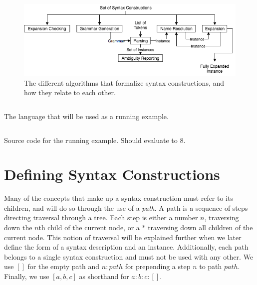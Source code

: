 \documentclass{kththesis}
\begin{document}
\begin{figure}[b]
\includegraphics[width=\textwidth]{resources/formalization-flowchart}
\caption{The different algorithms that formalize syntax constructions, and how they relate to each other.}
\label{fig:formalization-flowchart}
\end{figure}

\clearpage
{}
\begin{listing}[t!]
\inputminted{syncon}{implementation/languages/formalization-example/language}
\caption{The language that will be used as a running example.\label{lst:formal-language}}
\end{listing}

\begin{listing}[H]
\inputminted[linenos]{text}{implementation/languages/formalization-example/file}
\caption{Source code for the running example. Should evaluate to $8$.\label{lst:formal-file}}
\end{listing}
\clearpage
\restoregeometry

\section{Defining Syntax Constructions}

Many of the concepts that make up a syntax construction must refer to its children, and will do so through the use of a \emph{path}. A path is a sequence of steps directing traversal through a tree. Each step is either a number $n$, traversing down the $n$th child of the current node, or a $*$ traversing down all children of the current node. This notion of traversal will be explained further when we later define the form of a syntax description and an instance. Additionally, each path belongs to a single syntax construction and must not be used with any other. We use $[]$ for the empty path and $n:path$ for prepending a step $n$ to path $path$. Finally, we use $[a, b, c]$ as shorthand for $a : b : c : []$.
\end{document}
